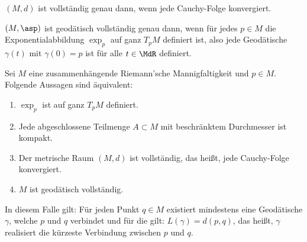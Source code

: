 \documentclass[a4paper,twoside,DIV15,BCOR12mm]{scrbook}
\begin{document}
\begin{definition}
$(M,d)$ ist vollständig genau dann, wenn jede Cauchy-Folge konvergiert.

$(M,\asp)$ ist geodätisch vollständig genau dann, wenn für jedes $p\in M$ die Exponentialabbildung $\exp_p$ auf ganz $T_pM$ definiert ist, also jede Geodätische $\gamma(t)$ mit $\gamma(0) = p$ ist für alle $t\in \MdR$ definiert.
\end{definition}

\begin{satz}
Sei $M$ eine zusammenhängende Riemann’sche Mannigfaltigkeit und $p\in M$. Folgende Aussagen sind äquivalent:
\begin{enumerate}
\item $\exp_p$ ist auf ganz $T_pM$ definiert.
\item Jede abgeschlossene Teilmenge $A\subset M$ mit beschränktem Durchmesser ist kompakt.
\item Der metrische Raum $(M,d)$ ist vollständig, das heißt, jede Cauchy-Folge konvergiert.
\item $M$ ist geodätisch vollständig.
\end{enumerate}
In diesem Falle gilt: Für jeden Punkt $q\in M$ existiert mindestens eine Geodätische $\gamma$, welche $p$ und $q$ verbindet und für die gilt: $L(\gamma) = d(p,q)$, das heißt, $\gamma$ realisiert die kürzeste Verbindung zwischen $p$ und $q$.
\end{satz}
\end{document}
